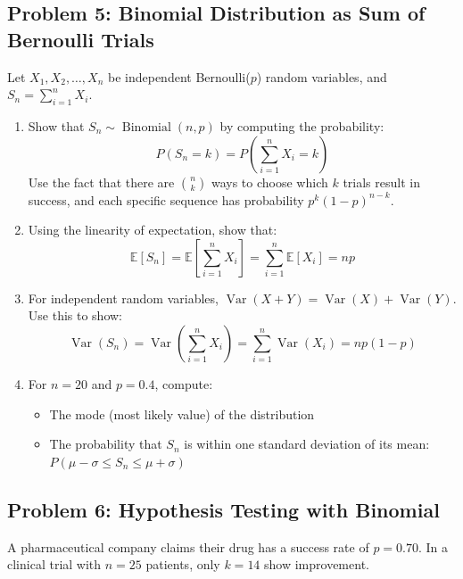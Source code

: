 \documentclass[12pt]{article}
\DeclareMathOperator{\Var}{Var}
\DeclareMathOperator{\Binom}{Binomial}
\begin{document}
\subsection*{Problem 5: Binomial Distribution as Sum of Bernoulli Trials}

Let \(X_1, X_2, \ldots, X_n\) be independent Bernoulli(\(p\)) random variables, and \(S_n = \sum_{i=1}^{n} X_i\).

\begin{enumerate}[label=(\alph*)]
\item Show that \(S_n \sim \Binom(n, p)\) by computing the probability:
\[
P(S_n = k) = P\left(\sum_{i=1}^{n} X_i = k\right)
\]
Use the fact that there are \(\binom{n}{k}\) ways to choose which \(k\) trials result in success, and each specific sequence has probability \(p^k(1-p)^{n-k}\).

\item Using the linearity of expectation, show that:
\[
\mathbb{E}[S_n] = \mathbb{E}\left[\sum_{i=1}^{n} X_i\right] = \sum_{i=1}^{n} \mathbb{E}[X_i] = np
\]

\item For independent random variables, \(\Var(X + Y) = \Var(X) + \Var(Y)\). Use this to show:
\[
\Var(S_n) = \Var\left(\sum_{i=1}^{n} X_i\right) = \sum_{i=1}^{n} \Var(X_i) = np(1-p)
\]

\item For \(n = 20\) and \(p = 0.4\), compute:
\begin{itemize}
\item The mode (most likely value) of the distribution
\item The probability that \(S_n\) is within one standard deviation of its mean: \(P(\mu - \sigma \leq S_n \leq \mu + \sigma)\)
\end{itemize}
\end{enumerate}

\subsection*{Problem 6: Hypothesis Testing with Binomial}

A pharmaceutical company claims their drug has a success rate of \(p = 0.70\). In a clinical trial with \(n = 25\) patients, only \(k = 14\) show improvement.
\end{document}

